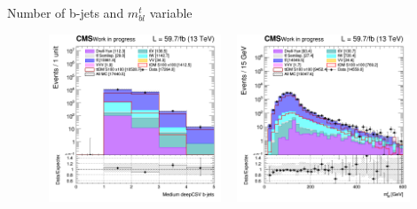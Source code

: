 \documentclass[8pt]{beamer}
\begin{document}
\begin{frame}{Number of b-jets and $m_{bl}^t$ variable}
\justifying
\begin{figure}[htbp]
\centering
\begin{minipage}[b]{.49\textwidth}
\includegraphics[width=5.5cm, height=5cm]{figs/2018/SmearSR-ttDM-scalar100/log_cratio_topCR_ll_nbjet.png}
\end{minipage}\hfill
\begin{minipage}[b]{.49\textwidth}
\includegraphics[width=5.5cm, height=5cm]{figs/2018/SmearSR-ttDM-scalar100/log_cratio_topCR_ll_mblt.png}
\end{minipage} \hfill
\label{fig:SRdiscmblt}
\end{figure}
\end{frame}
\end{document}
